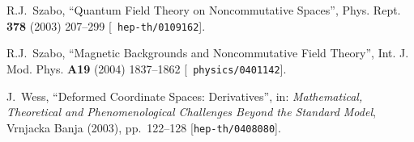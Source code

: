 \documentclass[11pt,a4paper]{article}
\newcommand{\1}{\mathbb{1}}
\begin{document}
\begin{thebibliography}{99}
 R.J.~Szabo, ``Quantum Field Theory on Noncommutative
  Spaces'', Phys. Rept. {\bf 378} (2003) 207--299 [{\tt
    hep-th/0109162}].

 R.J.~Szabo, ``Magnetic Backgrounds and Noncommutative
  Field Theory'', Int. J. Mod. Phys. {\bf A19} (2004) 1837--1862 [{\tt
    physics/0401142}].

  J.~Wess,
  ``Deformed Coordinate Spaces: Derivatives'',
   in: {\sl Mathematical, Theoretical and Phenomenological Challenges
     Beyond the Standard Model}, Vrnjacka Banja (2003), pp.~122--128
[{\tt hep-th/0408080}].

\end{thebibliography}
\end{document}
